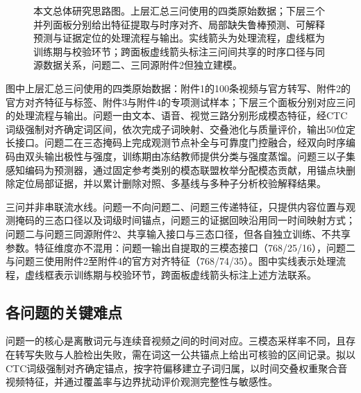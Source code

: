 \begin{figure}[htbp]
{}
\caption{本文总体研究思路图。上层汇总三问使用的四类原始数据；下层三个并列面板分别给出特征提取与时序对齐、局部缺失鲁棒预测、可解释预测与证据定位的处理流程与输出。实线箭头为处理流程，虚线框为训练期与校验环节；跨面板虚线箭头标注三问间共享的时序口径与同源数据关系，问题二、三同源附件2但独立建模。}
\label{prob:fig:framework}
\end{figure}
图中上层汇总三问使用的四类原始数据：附件1的100条视频与官方转写、附件2的官方对齐特征与标签、附件3与附件4的专项测试样本；下层三个面板分别对应三问的处理流程与输出。问题一由文本、语音、视觉三路分别形成模态特征，经CTC词级强制对齐确定词区间，依次完成子词映射、交叠池化与质量评价，输出50位定长接口。问题二在三态掩码上完成观测节点补全与可靠度门控融合，经双向时序编码由双头输出极性与强度，训练期由冻结教师提供分类与强度蒸馏。问题三以子集感知编码为预测器，通过固定参考类别的模态联盟枚举分配模态贡献，用锚点块删除定位局部证据，并以累计删除对照、多基线与多种子分析校验解释结果。

三问并非串联流水线。问题一不向问题二、问题三传递特征，只提供内容位置与观测掩码的三态口径以及词级时间锚点，问题三的证据回映沿用同一时间映射方式；问题二与问题三同源附件2、共享输入接口与三态口径，但各自独立训练、不共享参数。特征维度亦不混用：问题一输出自提取的三模态接口（768/25/16），问题二与问题三使用附件2至附件4的官方对齐特征（768/74/35）。图中实线表示处理流程，虚线框表示训练期与校验环节，跨面板虚线箭头标注上述方法联系。

\subsection{各问题的关键难点}
问题一的核心是离散词元与连续音视频之间的时间对应。三模态采样率不同，且存在转写失败与人脸检出失败，需在词这一公共锚点上给出可核验的区间记录。拟以CTC词级强制对齐确定锚点，按字符偏移建立子词归属，以时间交叠权重聚合音视频特征，并通过覆盖率与边界扰动评价观测完整性与敏感性。

